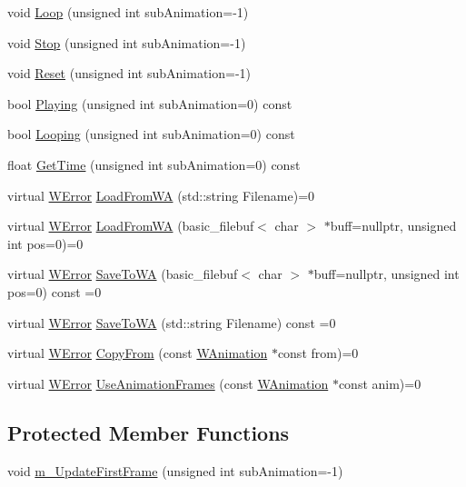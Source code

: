 \begin{DoxyCompactItemize}
\item 
void \hyperlink{class_w_animation_a559fff86972e7cf44a744f8078bebe56}{Loop} (unsigned int sub\+Animation=-\/1)
\item 
void \hyperlink{class_w_animation_a1bcf0c8298ffa440df1a3332008997a8}{Stop} (unsigned int sub\+Animation=-\/1)
\item 
void \hyperlink{class_w_animation_aa80c5c55a56dac19b1ee9f14d4f4e864}{Reset} (unsigned int sub\+Animation=-\/1)
\item 
bool \hyperlink{class_w_animation_a45eb95970e48cfb50657e5b551afb66a}{Playing} (unsigned int sub\+Animation=0) const 
\item 
bool \hyperlink{class_w_animation_a0491a2e346bd3288dc25dacea32ce3a7}{Looping} (unsigned int sub\+Animation=0) const 
\item 
float \hyperlink{class_w_animation_a9bdbde4087f3752e8178e606aeda5d42}{Get\+Time} (unsigned int sub\+Animation=0) const 
\item 
virtual \hyperlink{class_w_error}{W\+Error} \hyperlink{class_w_animation_a011a53c9674f21c34f86883cefef3ad3}{Load\+From\+WA} (std\+::string Filename)=0
\item 
virtual \hyperlink{class_w_error}{W\+Error} \hyperlink{class_w_animation_a85ef267b11ef54ac9a2a4beba53eb1d4}{Load\+From\+WA} (basic\+\_\+filebuf$<$ char $>$ $\ast$buff=nullptr, unsigned int pos=0)=0
\item 
virtual \hyperlink{class_w_error}{W\+Error} \hyperlink{class_w_animation_a0cac916766d0ad9ec50621a365518536}{Save\+To\+WA} (basic\+\_\+filebuf$<$ char $>$ $\ast$buff=nullptr, unsigned int pos=0) const  =0
\item 
virtual \hyperlink{class_w_error}{W\+Error} \hyperlink{class_w_animation_aa9d5d21f13a215a7ccf2432a3d9aeef0}{Save\+To\+WA} (std\+::string Filename) const  =0
\item 
virtual \hyperlink{class_w_error}{W\+Error} \hyperlink{class_w_animation_a42ee18109b6a417733c81d513f82184d}{Copy\+From} (const \hyperlink{class_w_animation}{W\+Animation} $\ast$const from)=0
\item 
virtual \hyperlink{class_w_error}{W\+Error} \hyperlink{class_w_animation_af341efba3efd68107679396c2e31839d}{Use\+Animation\+Frames} (const \hyperlink{class_w_animation}{W\+Animation} $\ast$const anim)=0
\end{DoxyCompactItemize}
\subsection*{Protected Member Functions}
\begin{DoxyCompactItemize}
\item 
void \hyperlink{class_w_animation_a6bf60a7c40631e99b88a8a8cb1ea88e8}{m\+\_\+\+Update\+First\+Frame} (unsigned int sub\+Animation=-\/1)
\end{DoxyCompactItemize}
